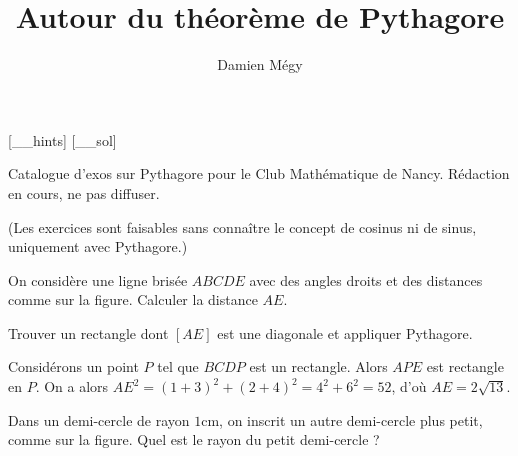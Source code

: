




[_\jobname_hints]
[_\jobname_sol]


\title{Autour du théorème de Pythagore}
\author{Damien Mégy}
\maketitle

Catalogue d'exos sur Pythagore pour le Club Mathématique de Nancy. Rédaction en cours, ne pas diffuser.


(Les exercices sont faisables sans connaître le concept de cosinus ni de sinus, uniquement avec Pythagore.)



\begin{exo}
On considère une ligne brisée $ABCDE$ avec des angles droits et des distances comme sur la figure.
Calculer la distance $AE$.
\begin{center}
\end{center}
\begin{hint}
Trouver un rectangle dont $[AE]$ est une diagonale et appliquer Pythagore.
\end{hint}
\begin{sol}
Considérons un point $P$ tel que $BCDP$ est un rectangle. Alors $APE$ est rectangle en $P$.
On a alors $AE^2 = (1+3)^2+(2+4)^2=4^2+6^2=52$, d'où $AE=2\sqrt{13}$.
\end{sol}
\end{exo}


\begin{exo}
Dans un demi-cercle de rayon $1$cm, on inscrit un autre demi-cercle plus petit, comme sur la figure.
Quel est le rayon du petit demi-cercle ?
\begin{center}
\end{center}
\end{exo}




